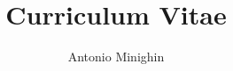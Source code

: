 \documentclass{article}
\begin{document}
\title{Curriculum Vitae}
\author{Antonio Minighin}

\maketitle
\end{document}
